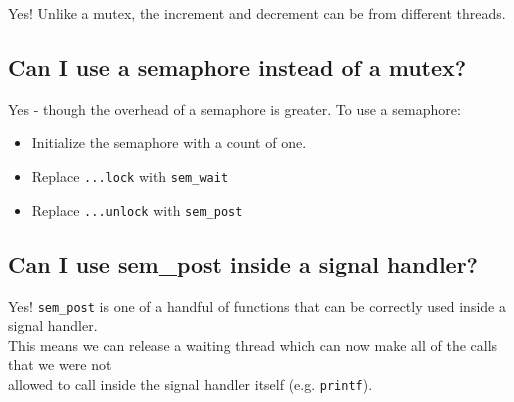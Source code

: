 Yes! Unlike a mutex, the increment and decrement can be from different
threads.

\subsection{Can I use a semaphore instead of a
mutex?}\label{can-i-use-a-semaphore-instead-of-a-mutex}

Yes - though the overhead of a semaphore is greater. To use a semaphore:

\begin{itemize}
\itemsep1pt\parskip0pt
\item
  Initialize the semaphore with a count of one.
\item
  Replace \texttt{...lock} with \texttt{sem\_wait}
\item
  Replace \texttt{...unlock} with \texttt{sem\_post}
\end{itemize}

\subsection{Can I use sem\_post inside a signal
handler?}\label{can-i-use-semux5fpost-inside-a-signal-handler}

Yes! \texttt{sem\_post} is one of a handful of functions that can be
correctly used inside a signal handler.\\This means we can release a
waiting thread which can now make all of the calls that we were
not\\allowed to call inside the signal handler itself (e.g.
\texttt{printf}).

